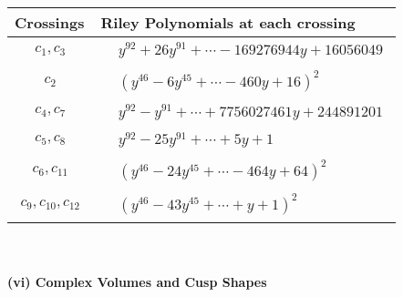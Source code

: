 \documentclass[1p]{elsarticle_modified}
\theoremstyle{definition}
\begin{document}
\begin{tabular}{m{50pt}|m{274pt}}
Crossings & \hspace{64pt}Riley Polynomials at each crossing \\
\hline $$\begin{aligned}c_{1},c_{3}\end{aligned}$$&$\begin{aligned}
&y^{92}+26 y^{91}+\cdots-169276944 y+16056049
\end{aligned}$\\
\hline $$\begin{aligned}c_{2}\end{aligned}$$&$\begin{aligned}
&(y^{46}-6 y^{45}+\cdots-460 y+16)^{2}
\end{aligned}$\\
\hline $$\begin{aligned}c_{4},c_{7}\end{aligned}$$&$\begin{aligned}
&y^{92}- y^{91}+\cdots+7756027461 y+244891201
\end{aligned}$\\
\hline $$\begin{aligned}c_{5},c_{8}\end{aligned}$$&$\begin{aligned}
&y^{92}-25 y^{91}+\cdots+5 y+1
\end{aligned}$\\
\hline $$\begin{aligned}c_{6},c_{11}\end{aligned}$$&$\begin{aligned}
&(y^{46}-24 y^{45}+\cdots-464 y+64)^{2}
\end{aligned}$\\
\hline $$\begin{aligned}c_{9},c_{10},c_{12}\end{aligned}$$&$\begin{aligned}
&(y^{46}-43 y^{45}+\cdots+y+1)^{2}
\end{aligned}$\\
\hline
\end{tabular}\\~\\
\newpage\flushleft \textbf{(vi) Complex Volumes and Cusp Shapes}
\end{document}
